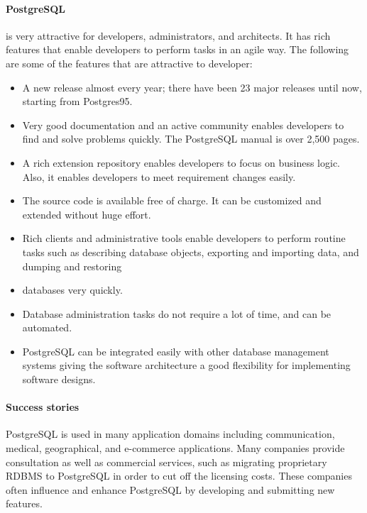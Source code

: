 \paragraph{PostgreSQL} is very attractive for developers, administrators, and architects. It has rich features that enable developers to perform tasks in an agile way. The following are some of the features that are attractive to developer:
\begin{itemize}
	\item A new release almost every year; there have been 23 major releases until now, starting from Postgres95.
	\item Very good documentation and an active community enables developers to find and solve problems quickly. The PostgreSQL manual is over 2,500 pages.
	\item A rich extension repository enables developers to focus on business logic. Also, it enables developers to meet requirement changes easily.
	\item The source code is available free of charge. It can be customized and extended without huge effort.
	\item Rich clients and administrative tools enable developers to perform routine tasks such as describing database objects, exporting and importing data, and dumping and restoring \item databases very quickly.
	\item Database administration tasks do not require a lot of time, and can be automated.
	\item PostgreSQL can be integrated easily with other database management systems giving the software architecture a good flexibility for implementing software designs.
\end{itemize}

\paragraph{Success stories}
PostgreSQL is used in many application domains including communication, medical, geographical, and e-commerce applications. Many companies provide consultation as well as commercial services, such as migrating proprietary RDBMS to PostgreSQL in order to cut off the licensing costs. These companies often influence and enhance PostgreSQL by developing and submitting new features.
\newline

